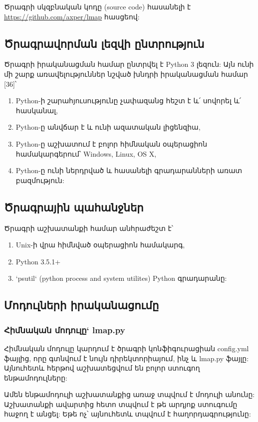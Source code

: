 \documentclass[a4paper,12pt]{article}
\begin{document}
\begin{sloppypar}
Ծրագրի սկզբնական կոդը (source code) հասանելի է \url{https://github.com/axper/lmap} հասցեով:


\subsection{Ծրագրավորման լեզվի ընտրություն}


Ծրագրի իրականացման համար ընտրվել է Python 3 լեզուն:
Այն ունի մի շարք առավելություններ նշված խնդրի իրականացման համար [36]՝

\begin{enumerate}
\item Python-ի շարահյուսությունը չափազանց հեշտ է և՛ սովորել և՛ հասկանալ,
\item Python-ը անվճար է և ունի ազատական լիցենզիա,
\item Python-ը աշխատում է բոլոր հիմնական օպերացիոն համակարգերում՝ Windows, Linux, OS X,
\item Python-ը ունի ներդրված և հասանելի գրադարանների առատ բազմություն:
\end{enumerate}


\subsection{Ծրագրային պահանջներ}

Ծրագրի աշխատանքի համար անհրաժեշտ է՝

\begin{enumerate}
\item Unix-ի վրա հիմնված օպերացիոն համակարգ,
\item Python 3.5.1+
\item `psutil` (python process and system utilites) Python գրադարանը:
\end{enumerate}

\subsection{Մոդուլների իրականացումը}


\subsubsection{Հիմնական մոդուլը` lmap.py}


Հիմնական մոդուլը կարդում է ծրագրի կոնֆիգուրացիան config.yml ֆայլից,
որը գտնվում է նույն դիրեկտորիայում, ինչ և lmap.py ֆայլը: Այնուհետև
հերթով աշխատեցվում են բոլոր ստուգող ենթամոդուլները:

Ամեն ենթամոդուլի աշխատանքից առաջ տպվում է մոդուլի անունը:
Աշխատանքի ավարտից հետո տպվում է թե արդյոք ստուգումը հաջող է անցել:
Եթե ոչ՝ այնուհետև տպվում է հաղորդագրությունը:



\end{sloppypar}
\end{document}
